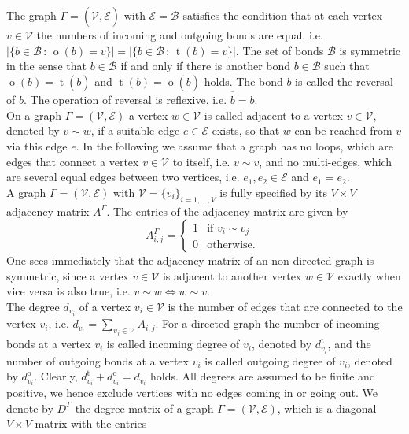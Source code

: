 The graph $\widetilde{\Gamma} = (\mathcal{V}, \widetilde{\mathcal{E}})$ with $\widetilde{\mathcal{E}} = \mathcal{B}$ satisfies the condition that at each vertex $v \in \mathcal{V}$ the numbers of incoming and outgoing bonds are equal, i.e. $\left\lvert \{ b \in \mathcal{B} \, \colon \, \operatorname{o}(b) = v \} \right\rvert = \left\lvert \{ b \in \mathcal{B} \, \colon \, \operatorname{t}(b) = v \} \right\rvert$. The set of bonds $\mathcal{B}$ is symmetric in the sense that $b \in \mathcal{B}$ if and only if there is another bond $\overline{b} \in \mathcal{B}$ such that $\operatorname{o}(b) = \operatorname{t}(\overline{b})$ and $\operatorname{t}(b) = \operatorname{o}(\overline{b})$ holds. The bond $\overline{b}$ is called the reversal of $b$. The operation of reversal is reflexive, i.e. $\overline{\overline{b}} = b$. \\
On a graph $\Gamma = (\mathcal{V}, \mathcal{E})$ a vertex $w \in \mathcal{V}$ is called adjacent to a vertex $v \in \mathcal{V}$, denoted by $v \sim w$, if a suitable edge $e \in \mathcal{E}$ exists, so that $w$ can be reached from $v$ via this edge $e$. In the following we assume that a graph has no loops, which are edges that connect a vertex $v \in \mathcal{V}$ to itself, i.e. $v \sim v$, and no multi-edges, which are several equal edges between two vertices, i.e. $e_1, e_2 \in \mathcal{E}$ and $e_1 = e_2$. \\
A graph $\Gamma = (\mathcal{V}, \mathcal{E})$ with $\mathcal{V} = \{v_i\}_{i = 1, \ldots, V}$ is fully specified by its $V \times V$ adjacency matrix $A^{\Gamma}$. The entries of the adjacency matrix are given by
\begin{equation}
    \label{adjacency matrix}
    A^{\Gamma}_{i, j} = \begin{cases} 1 & \text{if } v_i \sim v_j \\ 0 & \text{otherwise. } \end{cases}
\end{equation}
One sees immediately that the adjacency matrix of an non-directed graph is symmetric, since a vertex $v \in \mathcal{V}$ is adjacent to another vertex $w \in \mathcal{V}$ exactly when vice versa is also true, i.e. $v \sim w \Leftrightarrow w \sim v$. \\
The degree $d_{v_i}$ of a vertex $v_i \in \mathcal{V}$ is the number of edges that are connected to the vertex $v_i$, i.e. $d_{v_i} = \sum_{v_j \in \mathcal{V}} A_{i, j}$. For a directed graph the number of incoming bonds at a vertex $v_i$ is called incoming degree of $v_i$, denoted by $d^{\operatorname{t}}_{v_i}$, and the number of outgoing bonds at a vertex $v_i$ is called outgoing degree of $v_i$, denoted by $d^{\operatorname{o}}_{v_i}$. Clearly, $d^{\operatorname{t}}_{v_i} + d^{\operatorname{o}}_{v_i} = d_{v_i}$ holds. All degrees are assumed to be finite and positive, we hence exclude vertices with no edges coming in or going out. We denote by $D^{\Gamma}$ the degree matrix of a graph $\Gamma = (\mathcal{V}, \mathcal{E})$, which is a diagonal $V \times V$ matrix with the entries
